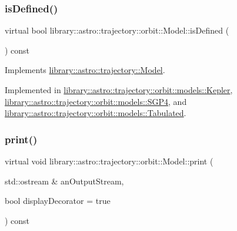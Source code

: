 \subsubsection{\texorpdfstring{is\+Defined()}{isDefined()}}
{\footnotesize\ttfamily virtual bool library\+::astro\+::trajectory\+::orbit\+::\+Model\+::is\+Defined (\begin{DoxyParamCaption}{ }\end{DoxyParamCaption}) const\hspace{0.3cm}{\ttfamily [pure virtual]}}



Implements \hyperlink{classlibrary_1_1astro_1_1trajectory_1_1_model_a9b55db62f22c3493313661bacd9f7c1b}{library\+::astro\+::trajectory\+::\+Model}.



Implemented in \hyperlink{classlibrary_1_1astro_1_1trajectory_1_1orbit_1_1models_1_1_kepler_a600d7752a50924ee6e3fc08f18a229e9}{library\+::astro\+::trajectory\+::orbit\+::models\+::\+Kepler}, \hyperlink{classlibrary_1_1astro_1_1trajectory_1_1orbit_1_1models_1_1_s_g_p4_a2d70ef4601e453156a430115e11ce8d7}{library\+::astro\+::trajectory\+::orbit\+::models\+::\+S\+G\+P4}, and \hyperlink{classlibrary_1_1astro_1_1trajectory_1_1orbit_1_1models_1_1_tabulated_af68120eb6651e8461c02a465923e533f}{library\+::astro\+::trajectory\+::orbit\+::models\+::\+Tabulated}.

\mbox{\label{classlibrary_1_1astro_1_1trajectory_1_1orbit_1_1_model_abd4fb7604274cc8b3589a445db64e98c}} 
\subsubsection{\texorpdfstring{print()}{print()}}
{\footnotesize\ttfamily virtual void library\+::astro\+::trajectory\+::orbit\+::\+Model\+::print (\begin{DoxyParamCaption}\item[{std\+::ostream \&}]{an\+Output\+Stream,  }\item[{bool}]{display\+Decorator = {\ttfamily true} }\end{DoxyParamCaption}) const\hspace{0.3cm}{\ttfamily [pure virtual]}}



